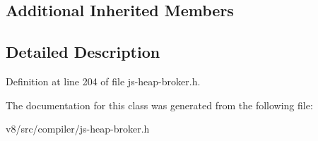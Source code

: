 \subsection*{Additional Inherited Members}


\subsection{Detailed Description}


Definition at line 204 of file js-\/heap-\/broker.\+h.



The documentation for this class was generated from the following file\+:\begin{DoxyCompactItemize}
\item 
v8/src/compiler/js-\/heap-\/broker.\+h\end{DoxyCompactItemize}
